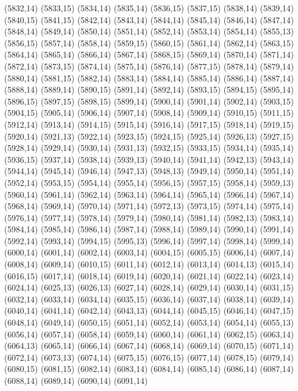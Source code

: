 (5832,14)
(5833,15)
(5834,14)
(5835,14)
(5836,15)
(5837,15)
(5838,14)
(5839,14)
(5840,15)
(5841,15)
(5842,14)
(5843,14)
(5844,14)
(5845,14)
(5846,14)
(5847,14)
(5848,14)
(5849,14)
(5850,14)
(5851,14)
(5852,14)
(5853,14)
(5854,14)
(5855,13)
(5856,15)
(5857,14)
(5858,14)
(5859,15)
(5860,15)
(5861,14)
(5862,14)
(5863,15)
(5864,14)
(5865,14)
(5866,14)
(5867,14)
(5868,15)
(5869,14)
(5870,14)
(5871,14)
(5872,14)
(5873,15)
(5874,14)
(5875,14)
(5876,14)
(5877,15)
(5878,14)
(5879,14)
(5880,14)
(5881,15)
(5882,14)
(5883,14)
(5884,14)
(5885,14)
(5886,14)
(5887,14)
(5888,14)
(5889,14)
(5890,15)
(5891,14)
(5892,14)
(5893,15)
(5894,15)
(5895,14)
(5896,15)
(5897,15)
(5898,15)
(5899,14)
(5900,14)
(5901,14)
(5902,14)
(5903,15)
(5904,15)
(5905,14)
(5906,14)
(5907,14)
(5908,14)
(5909,14)
(5910,15)
(5911,15)
(5912,14)
(5913,14)
(5914,15)
(5915,14)
(5916,14)
(5917,15)
(5918,14)
(5919,15)
(5920,14)
(5921,13)
(5922,14)
(5923,15)
(5924,15)
(5925,14)
(5926,13)
(5927,15)
(5928,14)
(5929,14)
(5930,14)
(5931,13)
(5932,15)
(5933,15)
(5934,14)
(5935,14)
(5936,15)
(5937,14)
(5938,14)
(5939,13)
(5940,14)
(5941,14)
(5942,13)
(5943,14)
(5944,14)
(5945,14)
(5946,14)
(5947,13)
(5948,13)
(5949,14)
(5950,14)
(5951,14)
(5952,14)
(5953,15)
(5954,14)
(5955,14)
(5956,15)
(5957,15)
(5958,14)
(5959,13)
(5960,14)
(5961,14)
(5962,14)
(5963,14)
(5964,14)
(5965,14)
(5966,14)
(5967,14)
(5968,14)
(5969,14)
(5970,14)
(5971,14)
(5972,13)
(5973,15)
(5974,14)
(5975,14)
(5976,14)
(5977,14)
(5978,14)
(5979,14)
(5980,14)
(5981,14)
(5982,13)
(5983,14)
(5984,14)
(5985,14)
(5986,14)
(5987,14)
(5988,14)
(5989,14)
(5990,14)
(5991,14)
(5992,14)
(5993,14)
(5994,15)
(5995,13)
(5996,14)
(5997,14)
(5998,14)
(5999,14)
(6000,14)
(6001,14)
(6002,14)
(6003,14)
(6004,15)
(6005,15)
(6006,14)
(6007,14)
(6008,14)
(6009,14)
(6010,15)
(6011,14)
(6012,14)
(6013,14)
(6014,13)
(6015,14)
(6016,15)
(6017,14)
(6018,14)
(6019,14)
(6020,14)
(6021,14)
(6022,14)
(6023,14)
(6024,14)
(6025,13)
(6026,13)
(6027,14)
(6028,14)
(6029,14)
(6030,14)
(6031,15)
(6032,14)
(6033,14)
(6034,14)
(6035,15)
(6036,14)
(6037,14)
(6038,14)
(6039,14)
(6040,14)
(6041,14)
(6042,14)
(6043,13)
(6044,14)
(6045,15)
(6046,14)
(6047,15)
(6048,14)
(6049,14)
(6050,15)
(6051,14)
(6052,14)
(6053,14)
(6054,14)
(6055,13)
(6056,14)
(6057,14)
(6058,14)
(6059,14)
(6060,14)
(6061,14)
(6062,15)
(6063,14)
(6064,13)
(6065,14)
(6066,14)
(6067,14)
(6068,14)
(6069,14)
(6070,15)
(6071,14)
(6072,14)
(6073,13)
(6074,14)
(6075,15)
(6076,15)
(6077,14)
(6078,15)
(6079,14)
(6080,15)
(6081,15)
(6082,14)
(6083,14)
(6084,14)
(6085,14)
(6086,14)
(6087,14)
(6088,14)
(6089,14)
(6090,14)
(6091,14)
